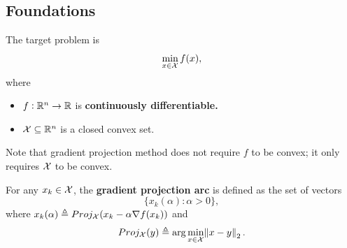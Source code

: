 \begin{refsection}
\subsection{Foundations}
\begin{definition}
The target problem is
$$\min_{x\in\mathcal{X}} f(x),$$
where
\begin{itemize}
	\item $f:\mathbb{R}^n\to \mathbb{R}$ is \textbf{continuously differentiable.}
	\item $\mathcal{X} \subseteq \mathbb{R}^n$ is a closed convex set.
\end{itemize}
\end{definition}

\begin{note}
Note that gradient projection method does not require $f$ to be convex; it only requires $\mathcal{X}$ to be convex.
\end{note}



\begin{definition}
For any $x_k \in \mathcal{X}$, the \textbf{gradient projection arc} is defined as the set of vectors
$$\{x_k(\alpha):\alpha>0\},$$
where $x_k(\alpha) \triangleq Proj_{\mathcal{X}} (x_k - \alpha \nabla f(x_k))$ and 
$$Proj_{\mathcal{X}}(y) \triangleq \arg\min_{x\in\mathcal{X}} \norm{x-y}_2.$$ 
\end{definition}




\end{refsection}
